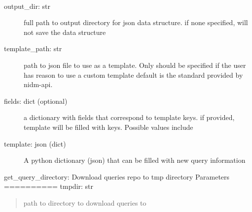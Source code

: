 \documentclass[letterpaper,10pt,english]{sphinxmanual}
\begin{document}

\begin{fulllineitems}
\label{nidm:nidm.query.generate_query_template}~\begin{description}
\item[{output\_dir: str}] \leavevmode
full path to output directory for json data structure.
if none specified, will not save the data structure

\item[{template\_path: str}] \leavevmode
path to json file to use as a template. Only should be
specified if the user has reason to use a custom template
default is the standard provided by nidm-api.

\item[{fields: dict (optional)}] \leavevmode
a dictionary with fields that correspond to template keys.
if provided, template will be filled with keys. Possible values
include

\end{description}
\begin{description}
\item[{template: json (dict)}] \leavevmode
A python dictionary (json) that can be filled with
new query information

\end{description}

\end{fulllineitems}


\begin{fulllineitems}
\label{nidm:nidm.query.get_query_directory}
get\_query\_directory:
Download queries repo to tmp directory
Parameters
==========
tmpdir: str
\begin{quote}

path to directory to download queries to
\end{quote}

\end{fulllineitems}

\end{document}
